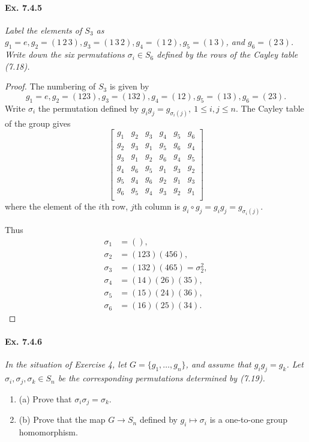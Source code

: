 \documentclass[11pt,a4paper]{article}
\newcommand{\be} {\begin{enumerate}}
\newcommand{\ee} {\end{enumerate}}
\begin{document}
\paragraph{Ex. 7.4.5}

{\it Label the elements of $S_3$ as $g_1 = e,g_2 = (1\,2\,3),g_3 = (1\,3\,2),g_4 = (1\,2),g_5 = (1\,3)$, and $g_6 = (2\,3)$. Write down the six permutations $\sigma_i\in S_6$ defined by the rows of the Cayley table (7.18).
}

\begin{proof}
The numbering of $S_3$ is given by $$g_1=e,g_2 = (1 2 3), g_3 = (1 3 2), g_4 = (1 2), g_5 = (1 3), g_6 = (2 3).$$
Write $\sigma_i$ the permutation defined by $g_i g_j = g_{\sigma_i(j)}, \ 1 \leq i,j \leq n$.
The Cayley table of the group gives
$$
\left[
\begin{array}{cccccc}
g_1 & g_2 &  g_3 & g_4 & g_5  & g_6\\
g_2 & g_3 &  g_1 & g_5 & g_6  & g_4\\
g_3 & g_1 &  g_2 & g_6 & g_4  & g_5\\
g_4 & g_6 &  g_5 & g_1 & g_3  & g_2\\
g_5 & g_4 &  g_6 & g_2 & g_1  & g_3\\
g_6 & g_5 &  g_4 & g_3 & g_2  & g_1\\
\end{array}
\right]
$$
where the element of the $i$th row, $j$th column is $g_i \circ g_j = g_i g_j =  g_{\sigma_i(j)}$.

Thus
\begin{align*} 
\sigma_1 &= (),\\
\sigma_2 &= (1 2 3)(4 5 6),\\
\sigma_3 &=(1 3 2)(4 6 5) = \sigma_2^2,\\
\sigma_4 &= (1 4)(2 6)(3 5),\\
\sigma_5 &= (1 5)(2 4)(3 6),\\
\sigma_6 &= (1 6)(2 5)(3 4).
\end{align*}
\end{proof}

\paragraph{Ex. 7.4.6}

{\it In the situation of Exercise 4, let $G = \{g_1,\ldots,g_n\}$, and assume that $g_ig_j = g_k$. Let $\sigma_i,\sigma_j,\sigma_k \in S_n$ be the corresponding permutations determined by (7.19).
\be
\item[(a)] Prove that $\sigma_i \sigma_j = \sigma_k$.
\item[(b)] Prove that the map $G \to S_n$ defined by $g_i \mapsto \sigma_i$ is a one-to-one group homomorphism.
\ee
}
\end{document}
